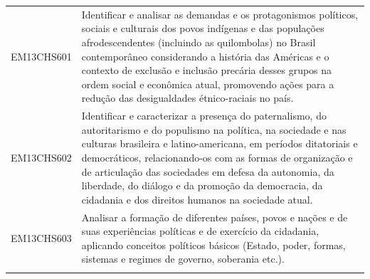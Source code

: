 \documentclass[12pt]{extarticle}
\begin{document}
\begin{longtable}{ll}
EM13CHS601 & Identificar e analisar as demandas e os protagonismos políticos, sociais e culturais dos povos indígenas e das populações afrodescendentes (incluindo as quilombolas) no Brasil contemporâneo considerando a história das Américas e o contexto de exclusão e inclusão precária desses grupos na ordem social e econômica atual, promovendo ações para a redução das desigualdades étnico-raciais no país.                                                                                                                                                                                                                                                                                                                                                                                                            \\
\rowcolor[HTML]{FFF} 
EM13CHS602 & Identificar e caracterizar a presença do paternalismo, do autoritarismo e do populismo na política, na sociedade e nas culturas brasileira e latino-americana, em períodos ditatoriais e democráticos, relacionando-os com as formas de organização e de articulação das sociedades em defesa da autonomia, da liberdade, do diálogo e da promoção da democracia, da cidadania e dos direitos humanos na sociedade atual.                                                                                                                                                                                                                                                                                                                                                                                             \\
\rowcolor[HTML]{E0F7FA} 
EM13CHS603 & Analisar a formação de diferentes países, povos e nações e de suas experiências políticas e de exercício da cidadania, aplicando conceitos políticos básicos (Estado, poder, formas, sistemas e regimes de governo, soberania etc.).                                                                                                                                                                                                                                                                                                                                                                                                                                                                                                                                                                                  \\
\rowcolor[HTML]{FFF} 

\end{longtable}
\end{document}
